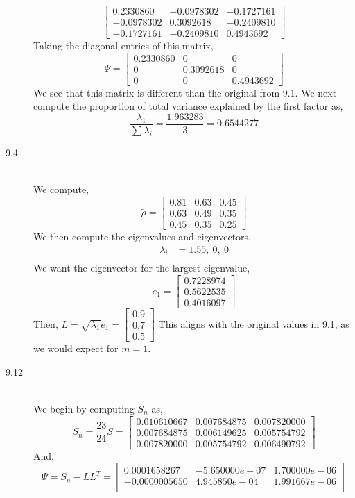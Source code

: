 \documentclass[letterpaper,10pt]{article}
\begin{document}
\begin{description}
\[\begin{bmatrix}
0.2330860 & -0.0978302 & -0.1727161\\
-0.0978302 & 0.3092618 & -0.2409810\\
-0.1727161 & -0.2409810 & 0.4943692
\end{bmatrix} \]
Taking the diagonal entries of this matrix,
\[\Psi=\begin{bmatrix}
0.2330860 & 0 & 0\\
0 & 0.3092618 & 0\\
0 & 0 & 0.4943692
\end{bmatrix}\]
We see that this matrix is different than the original from 9.1. We next compute the proportion of total variance explained by the first factor as,
\[\frac{\lambda_1}{\sum \lambda_i}=\frac{1.963283}{3}=0.6544277\]
\item[9.4]\hfill\\
We compute,
\[\tilde{\rho}=\begin{bmatrix}
0.81 & 0.63 & 0.45\\
0.63 & 0.49 & 0.35\\
0.45 & 0.35 & 0.25
\end{bmatrix} \]
We then compute the eigenvalues and eigenvectors,
\begin{align*}
\lambda_i &= 1.55,\ 0,\ 0\\
\end{align*}
We want the eigenvector for the largest eigenvalue,
\[e_1=\begin{bmatrix}
0.7228974\\0.5622535\\0.4016097
\end{bmatrix}\]
Then, $L=\sqrt{\lambda_1}e_1=\begin{bmatrix}
0.9\\0.7\\0.5
\end{bmatrix}$ This aligns with the original values in 9.1, as we would expect for $m=1$.
\item[9.12]\hfill\\
We begin by computing $S_n$ as,
\[S_n=\frac{23}{24}S=\begin{bmatrix}
0.010610667 & 0.007684875 & 0.007820000\\
0.007684875 & 0.006149625 & 0.005754792\\
0.007820000 & 0.005754792 & 0.006490792
\end{bmatrix} \]
And,
\[\Psi=S_n-LL^T=\begin{bmatrix}
0.0001658267 & -5.650000e-07 & 1.700000e-06\\
-0.0000005650 & 4.945850e-04 & 1.991667e-06\\

\end{bmatrix}\]
\end{description}
\end{document}
